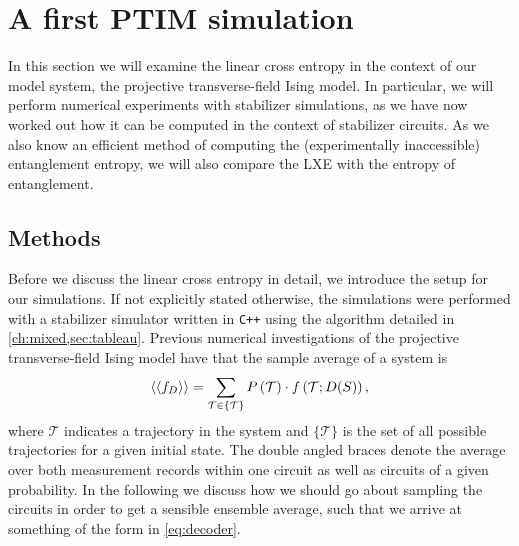 \section{A first PTIM simulation}

In this section we will examine the linear cross entropy in the context of our
model system, the projective transverse-field Ising model. In particular, we
will perform numerical experiments with stabilizer simulations, as we have now
worked out how it can be computed in the context of stabilizer circuits. As we
also know an efficient method of computing the (experimentally inaccessible)
entanglement entropy, we will also compare the LXE with the entropy of
entanglement.
\subsection{Methods}
Before we discuss the linear cross entropy in detail, we introduce the setup
for our simulations. If not explicitly stated otherwise, the simulations were
performed with a stabilizer simulator written in \verb|C++| using the algorithm detailed in
\cref{ch:mixed,sec:tableau}.
Previous numerical investigations of the projective transverse-field Ising
model have that the sample average of a system is
\cite{roserDecodingProjectiveTransverse2023}
\begin{align}\label{eq:decoder}
      \expval{\expval{f_D}} = \sum_{\mathcal{T} \in \{
    \mathcal{T} \} } P\left(\mathcal{T}\right) \cdot
    f\left(\mathcal{T} ; D(S)\right)
,\end{align}
where $\mathcal{T}$ indicates a trajectory in the system and
$\{ \mathcal{T} \}$ is the set of all possible trajectories for a given
initial state. The double angled braces 
denote the average over both measurement records within one circuit as well as
circuits of a given probability. In the following we discuss how we should go
about sampling the circuits in order to get a sensible ensemble average, such
that we arrive at something of the form in \cref{eq:decoder}.

